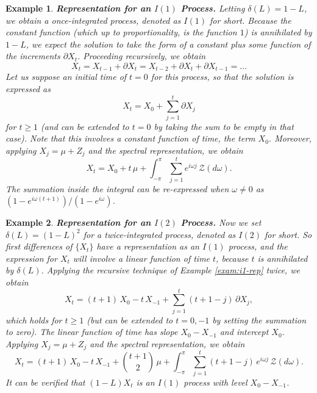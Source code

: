 \documentclass[a4paper]{book}
\newtheorem{Example}{Example}
\begin{document}
 \begin{Example} {\bf Representation for an $I(1)$ Process.}  \rm
 \label{exam:I1-rep}
    Letting $\delta (L)= 1-L$, we obtain a once-integrated process,
  denoted as $I(1)$ for short.    
  Because  the constant function (which up to proportionality, is the function $1$)
  is annihilated by $1-L$, we expect the solution to take the form
   of a constant plus some function of the increments $\partial X_t$.
   Proceeding recursively, we obtain
\[
  X_t =    X_{t-1} + \partial X_t = X_{t-2} + \partial X_t + \partial X_{t-1} = \ldots
\]
    Let us suppose an initial time of $t=0$ for this process, so that the
      solution is expressed as 
\[
 X_t = X_0 + \sum_{j=1}^t \partial X_j
\]
    for $t \geq 1$ (and can be extended to $t=0$ by taking the sum to be empty in that case).
  Note that this involves a constant function of time,
  the term $X_0$.  Moreover, applying $X_j = \mu + Z_j$ and the spectral representation,
  we obtain
\begin{equation*}
 X_t = X_0 + t \, \mu +   \int_{-\pi}^{\pi} \sum_{j=1}^t e^{i \omega j}
   \, \mathcal{Z} (d\omega).  
\end{equation*}
  The summation inside the integral can be re-expressed when $\omega \neq 0$ as
  $(1 - e^{i \omega (t+1)})/(1-e^{i \omega})$.
\end{Example}   


\begin{Example} {\bf Representation for an $I(2)$ Process.} \rm
\label{exam:i2-rep}
  Now we set  $\delta (L)= {(1-L)}^2$  for a twice-integrated process,
  denoted as $I(2)$ for short.    So first differences of $\{ X_t \}$ 
  have a representation as an $I(1)$ process, and the expression for
   $X_t$ will involve a linear function of time $t$, because $t$ is
  annihilated by $\delta (L)$.  Applying the recursive technique of 
  Example \ref{exam:i1-rep} twice, we obtain
 \[
 X_t = (t+1) \, X_0 - t \, X_{-1}  + \sum_{j=1}^t (t+1-j) \, \partial X_j,
\]
 which holds for $t \geq 1$  (but can be extended to $t=0,-1$ by setting
  the summation to zero).  The linear function of time has slope
  $X_0 - X_{-1}$ and intercept $X_0$.
 Applying $X_j = \mu + Z_j$ and the spectral representation,
  we obtain
\begin{equation*}
 X_t =(t+1) \, X_0 - t \, X_{-1}  + \binom{t+1}{2} \, \mu
 +  \int_{-\pi}^{\pi} \sum_{j=1}^t (t+1-j) \, e^{i \omega j}
   \, \mathcal{Z} (d\omega).  
\end{equation*}
 It can be verified that $(1-L) X_t$ is an $I(1)$ process with level
 $X_0 - X_{-1}$.
\end{Example}
\end{document}
